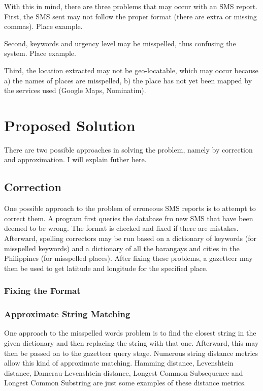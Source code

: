 \documentclass{acm_proc_article-sp}
\begin{document}
With this in mind, there are three problems that may occur with an SMS report.
First, the SMS sent may not follow the proper format (there are extra or missing commas). Place example.

Second, keywords and urgency level may be misspelled, thus confusing the system. Place example.

Third, the location extracted may not be geo-locatable, which may occur because a) the names of places are misspelled, b) the place has not yet been mapped by the services used
(Google Maps, Nominatim).

\section{Proposed Solution}
There are two possible approaches in solving the problem, namely by correction and approximation. I will explain futher here.

\subsection{Correction}
One possible approach to the problem of erroneous SMS reports is to attempt to correct them. A program first queries the database fro new SMS that have been deemed to be wrong. The format is checked and fixed if there are mistakes. Afterward, spelling correctors may be run based on a dictionary of keywords (for misspelled keywords) and a dictionary of all the barangays and cities in the Philippines (for misspelled places). After fixing these problems, a gazetteer may then be used to get latitude and longitude for the specified place. 

\subsubsection{Fixing the Format}
\subsubsection{Approximate String Matching}
One approach to the misspelled words problem is to find the closest string in the given dictionary and then
replacing the string with that one. Afterward, this may then be passed on to the gazetteer query stage. Numerous
string distance metrics allow this kind of approximate matching. Hamming distance, Levenshtein distance, Damerau-Levenshtein
distance, Longest Common Subsequence and Longest Common Substring are just some examples of these distance metrics. 
\end{document}
